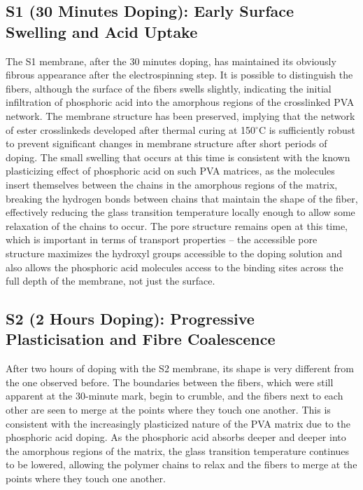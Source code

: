 \documentclass[12pt,a4paper]{report}
\begin{document}
\subsection{S1 (30 Minutes Doping): Early Surface Swelling and Acid Uptake}
The S1 membrane, after the 30 minutes doping, has maintained its obviously fibrous appearance after the electrospinning step. It is possible to distinguish the fibers, although the surface of the fibers swells slightly, indicating the initial infiltration of phosphoric acid into the amorphous regions of the crosslinked PVA network. The membrane structure has been preserved, implying that the network of ester crosslinkeds developed after thermal curing at 150\(^\circ\)C is sufficiently robust to prevent significant changes in membrane structure after short periods of doping.\cite{53, 54}
The small swelling that occurs at this time is consistent with the known plasticizing effect of phosphoric acid on such PVA matrices, as the molecules insert themselves between the chains in the amorphous regions of the matrix, breaking the hydrogen bonds between chains that maintain the shape of the fiber, effectively reducing the glass transition temperature locally enough to allow some relaxation of the chains to occur.\cite{35,52} The pore structure remains open at this time, which is important in terms of transport properties – the accessible pore structure maximizes the hydroxyl groups accessible to the doping solution and also allows the phosphoric acid molecules access to the binding sites across the full depth of the membrane, not just the surface.

\subsection{S2 (2 Hours Doping): Progressive Plasticisation and Fibre Coalescence}
After two hours of doping with the S2 membrane, its shape is very different from the one observed before. The boundaries between the fibers, which were still apparent at the 30-minute mark, begin to crumble, and the fibers next to each other are seen to merge at the points where they touch one another. This is consistent with the increasingly plasticized nature of the PVA matrix due to the phosphoric acid doping. As the phosphoric acid absorbs deeper and deeper into the amorphous regions of the matrix, the glass transition temperature continues to be lowered, allowing the polymer chains to relax and the fibers to merge at the points where they touch one another.\cite{4,35}
\end{document}
